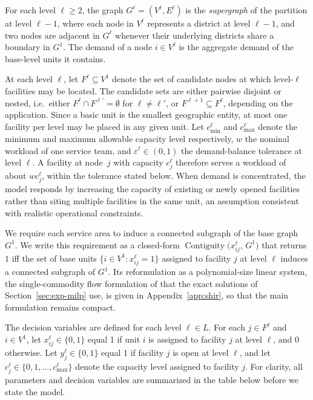 \documentclass[11pt]{article}
\theoremstyle{definition}
\DeclareMathOperator{\Contiguity}{Contiguity}  %
\begin{document}
For each level $\ell \geq 2$, the graph $G^\ell = (V^\ell, E^\ell)$ is the
\textit{supergraph} of the partition at level $\ell - 1$, where each node in $V^\ell$
represents a district at level $\ell - 1$, and two nodes are adjacent in $G^\ell$
whenever their underlying districts share a boundary in $G^1$. The demand of a node
$i \in V^\ell$ is the aggregate demand of the base-level units it contains.

At each level $\ell$, let $F^\ell \subseteq V^1$ denote the set of candidate
nodes at which level-$\ell$ facilities may be located. The candidate sets are either pairwise disjoint or nested, i.e.\ either $F^{\ell} \cap F^{\ell'} = \emptyset$ for $\ell \neq \ell'$, or $F^{\ell+1} \subseteq F^{\ell}$, depending on the application. Since a basic unit is the smallest geographic
entity, at most one facility per level may be placed in any given unit.
Let $c^\ell_{\min}$ and $c^{\ell}_{\max}$ denote the minimum and maximum allowable
capacity level respectively, $w$ the nominal workload of one service team, and
$\varepsilon^{\ell} \in (0,1)$ the demand-balance tolerance at level $\ell$. A facility at node~$j$ with capacity $c^{\ell}_j$ therefore serves a workload of about $w c^{\ell}_j$, within the tolerance stated below. When
demand is concentrated, the model responds by increasing the capacity of existing
or newly opened facilities rather than siting multiple facilities in the same
unit, an assumption consistent with realistic operational constraints.

We require each service area to induce a connected subgraph of the 
base graph $G^1$. We write this requirement as a closed-form 
$\Contiguity\!\bigl(x^{\ell}_{ij},\, G^1\bigr)$ that returns $1$ 
iff the set of base units $\{i \in V^1 : x^{\ell}_{ij} =1\}$ assigned 
to facility $j$ at level $\ell$ induces a connected subgraph of $G^1$. 
Its reformulation as a polynomial-size linear system, the single-commodity flow 
formulation of \citet{shirabe2005model} that the exact solutions of Section~\ref{sec:exp-milp} use, 
is given in Appendix~\ref{app:shir}, so that the main formulation remains compact.

The decision variables are defined for each level $\ell \in L$. For each
$j \in F^\ell$ and $i \in V^1$, let $x_{ij}^\ell \in \{0,1\}$ equal 1 if
unit $i$ is assigned to facility $j$ at level $\ell$, and 0 otherwise. Let
$y_j^\ell \in \{0,1\}$ equal 1 if facility $j$ is open at level $\ell$, and let
$c^{\ell}_j \in \{0, 1, \ldots, c^{\ell}_{\max}\}$ denote the capacity level 
assigned to facility $j$. For clarity, all parameters and decision variables 
are summarized in the table below before we state the model.
 
\end{document}
